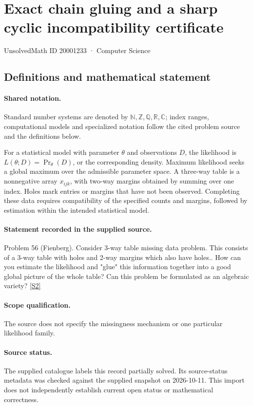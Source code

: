 \documentclass[11pt]{article}
\newcommand{\sref}[2]{\hyperlink{source:#1:#2}{[S#2]}}
\begin{document}
\setcounter{section}{20001232}
\section{Exact chain gluing and a sharp cyclic incompatibility certificate}\label{20001233}
{\small\sffamily UnsolvedMath ID 20001233 · Computer Science}
\subsection{Definitions and mathematical statement}

\paragraph{Shared notation.}Standard number systems are denoted by $\mathbb N,\mathbb Z,\mathbb Q,\mathbb R,\mathbb C$; index ranges, computational models and specialized notation follow the cited problem source and the definitions below.


For a statistical model with parameter $\theta$ and observations $D$, the likelihood is $L(\theta;D)=\Pr_\theta(D)$, or the corresponding density. Maximum likelihood seeks a global maximum over the admissible parameter space. A three-way table is a nonnegative array $x_{ijk}$, with two-way margins obtained by summing over one index. Holes mark entries or margins that have not been observed. Completing these data requires compatibility of the specified counts and margins, followed by estimation within the intended statistical model.
\paragraph{Statement recorded in the supplied source.}
Problem 56 (Fienberg). Consider 3-way table missing data problem. This consists of a 3-way table with holes and 2-way margins which also have holes.. How can you estimate the likelihood and "glue" this information together into a good global picture of the whole table? Can this problem be formulated as an algebraic variety? \sref{20001233}{2}
\paragraph{Scope qualification.}
The source does not specify the missingness mechanism or one particular likelihood family.
\paragraph{Source status.}
The supplied catalogue labels this record partially solved. Its source-status metadata was checked against the supplied snapshot on 2026-10-11. This import does not independently establish current open status or mathematical correctness.
\end{document}
